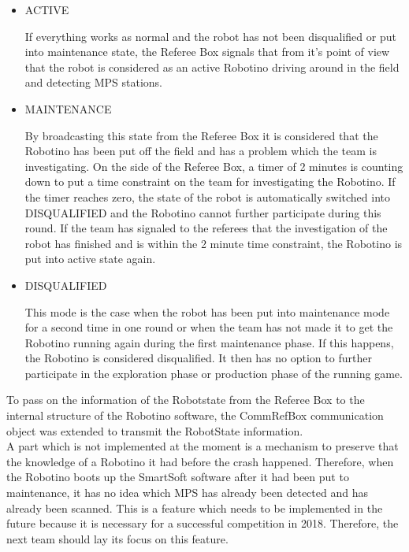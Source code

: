 \begin{itemize}

\item ACTIVE

If everything works as normal and the robot has not been disqualified or put into maintenance state, the Referee Box signals that from it's point of view that the robot is considered as an active Robotino driving around in the field and detecting MPS stations. 


\item MAINTENANCE

By broadcasting this state from the Referee Box it is considered that the Robotino has been put off the field and has a problem which the team is investigating. On the side of the Referee Box, a timer of 2 minutes is counting down to put a time constraint on the team for investigating the Robotino. If the timer reaches zero, the state of the robot is automatically switched into DISQUALIFIED and the Robotino cannot further participate during this round. If the team has signaled to the referees that the investigation of the robot has finished and is within the 2 minute time constraint, the Robotino is put into active state again. 

\item DISQUALIFIED

This mode is the case when the robot has been put into maintenance mode for a second time in one round or when the team has not made it to get the Robotino running again during the first maintenance phase. If this happens, the Robotino is considered disqualified. It then has no option to further participate in the exploration phase or production phase of the running game.  

\end{itemize}

To pass on the information of the Robotstate from the Referee Box to the internal structure of the Robotino software, the CommRefBox communication object was extended to transmit the RobotState information. \\


A part which is not implemented at the moment is a mechanism to preserve that the knowledge of a Robotino it had before the crash happened. Therefore, when the Robotino boots up the SmartSoft software after it had been put to maintenance, it has no idea which MPS has already been detected and has already been scanned. This is a feature which needs to be implemented in the future because it is necessary for a successful competition in 2018. Therefore, the next team should lay its focus on this feature. \\



